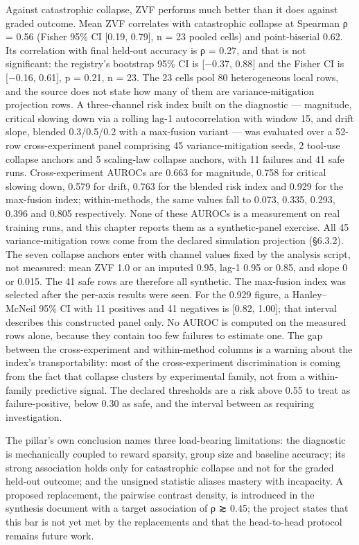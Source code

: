 \documentclass[12pt,a4paper]{report}
\begin{document}
Against catastrophic collapse, ZVF performs much better than it does
against graded outcome. Mean ZVF correlates with catastrophic collapse
at Spearman ρ = 0.56 (Fisher 95\% CI {[}0.19, 0.79{]}, n = 23 pooled
cells) and point-biserial 0.62. Its correlation with final held-out
accuracy is ρ = 0.27, and that is not significant: the registry's
bootstrap 95\% CI is {[}−0.37, 0.88{]} and the Fisher CI is {[}−0.16,
0.61{]}, p = 0.21, n = 23. The 23 cells pool 80 heterogeneous local
rows, and the source does not state how many of them are
variance-mitigation projection rows. A three-channel risk index built on
the diagnostic --- magnitude, critical slowing down via a rolling lag-1
autocorrelation with window 15, and drift slope, blended 0.3/0.5/0.2
with a max-fusion variant --- was evaluated over a 52-row
cross-experiment panel comprising 45 variance-mitigation seeds, 2
tool-use collapse anchors and 5 scaling-law collapse anchors, with 11
failures and 41 safe runs. Cross-experiment AUROCs are 0.663 for
magnitude, 0.758 for critical slowing down, 0.579 for drift, 0.763 for
the blended risk index and 0.929 for the max-fusion index;
within-methods, the same values fall to 0.073, 0.335, 0.293, 0.396 and
0.805 respectively. None of these AUROCs is a measurement on real
training runs, and this chapter reports them as a synthetic-panel
exercise. All 45 variance-mitigation rows come from the declared
simulation projection (§6.3.2). The seven collapse anchors enter with
channel values fixed by the analysis script, not measured: mean ZVF 1.0
or an imputed 0.95, lag-1 0.95 or 0.85, and slope 0 or 0.015. The 41
safe rows are therefore all synthetic. The max-fusion index was selected
after the per-axis results were seen. For the 0.929 figure, a
Hanley--McNeil 95\% CI with 11 positives and 41 negatives is {[}0.82,
1.00{]}; that interval describes this constructed panel only. No AUROC
is computed on the measured rows alone, because they contain too few
failures to estimate one. The gap between the cross-experiment and
within-method columns is a warning about the index's transportability:
most of the cross-experiment discrimination is coming from the fact that
collapse clusters by experimental family, not from a within-family
predictive signal. The declared thresholds are a risk above 0.55 to
treat as failure-positive, below 0.30 as safe, and the interval between
as requiring investigation.

The pillar's own conclusion names three load-bearing limitations: the
diagnostic is mechanically coupled to reward sparsity, group size and
baseline accuracy; its strong association holds only for catastrophic
collapse and not for the graded held-out outcome; and the unsigned
statistic aliases mastery with incapacity. A proposed replacement, the
pairwise contrast density, is introduced in the synthesis document with
a target association of ρ ≳ 0.45; the project states that this bar is
not yet met by the replacements and that the head-to-head protocol
remains future work.
\end{document}
